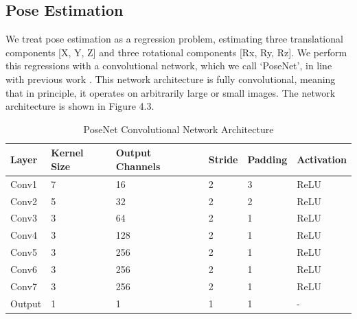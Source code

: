 \subsection{Pose Estimation}

We treat pose estimation as a regression problem, estimating three translational components [X, Y, Z] and three rotational components [Rx, Ry, Rz]. We perform this regressions with a convolutional network, which we call `PoseNet', in line with previous work \cite{zhan2018deepfeature,bian2019consistency,zhou2017unsupervised}. This network architecture is fully convolutional, meaning that in principle, it operates on arbitrarily large or small images. The network architecture is shown in Figure 4.3.

\begin{table}[h]

    \caption{PoseNet Convolutional Network Architecture}
    \centering
    \begin{tabular}{@{}llllll@{}}
        \toprule
        Layer               & Kernel Size   & Output Channels   & Stride    & Padding   & Activation\\ 
        \midrule
        Conv1               & 7             & 16                & 2         & 3         & ReLU      \\ 
        Conv2               & 5             & 32                & 2         & 2         & ReLU      \\ 
        Conv3               & 3             & 64                & 2         & 1         & ReLU      \\ 
        Conv4               & 3             & 128               & 2         & 1         & ReLU      \\
        Conv5               & 3             & 256               & 2         & 1         & ReLU      \\
        Conv6               & 3             & 256               & 2         & 1         & ReLU      \\
        Conv7               & 3             & 256               & 2         & 1         & ReLU      \\
        Output              & 1             & 1                 & 1         & 1         & -         \\ 
        \bottomrule
    \end{tabular}
    \label{posenet-layers}
\end{table}

